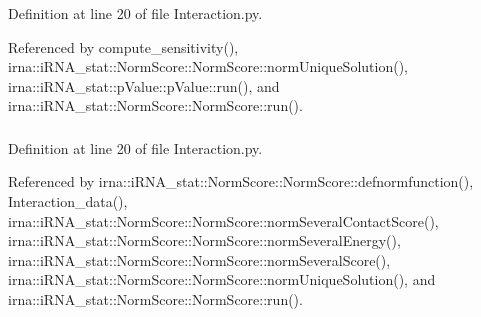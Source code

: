\-Definition at line 20 of file \-Interaction.\-py.



\-Referenced by compute\-\_\-sensitivity(), irna\-::i\-R\-N\-A\-\_\-stat\-::\-Norm\-Score\-::\-Norm\-Score\-::norm\-Unique\-Solution(), irna\-::i\-R\-N\-A\-\_\-stat\-::p\-Value\-::p\-Value\-::run(), and irna\-::i\-R\-N\-A\-\_\-stat\-::\-Norm\-Score\-::\-Norm\-Score\-::run().

\hypertarget{classirna_1_1iRNA__stat_1_1Interaction_1_1Interaction_a17b9cfe084bf759cc911770733454249}{
\subsubsection[{pos}]{}}
\label{classirna_1_1iRNA__stat_1_1Interaction_1_1Interaction_a17b9cfe084bf759cc911770733454249}


\-Definition at line 20 of file \-Interaction.\-py.



\-Referenced by irna\-::i\-R\-N\-A\-\_\-stat\-::\-Norm\-Score\-::\-Norm\-Score\-::defnormfunction(), \-Interaction\-\_\-data(), irna\-::i\-R\-N\-A\-\_\-stat\-::\-Norm\-Score\-::\-Norm\-Score\-::norm\-Several\-Contact\-Score(), irna\-::i\-R\-N\-A\-\_\-stat\-::\-Norm\-Score\-::\-Norm\-Score\-::norm\-Several\-Energy(), irna\-::i\-R\-N\-A\-\_\-stat\-::\-Norm\-Score\-::\-Norm\-Score\-::norm\-Several\-Score(), irna\-::i\-R\-N\-A\-\_\-stat\-::\-Norm\-Score\-::\-Norm\-Score\-::norm\-Unique\-Solution(), and irna\-::i\-R\-N\-A\-\_\-stat\-::\-Norm\-Score\-::\-Norm\-Score\-::run().

\hypertarget{classirna_1_1iRNA__stat_1_1Interaction_1_1Interaction_ad76df719016be0d2250d42eef707814d}{
\subsubsection[{ppv}]{}}
\label{classirna_1_1iRNA__stat_1_1Interaction_1_1Interaction_ad76df719016be0d2250d42eef707814d}



